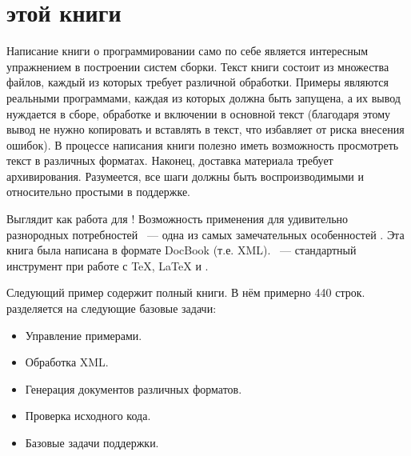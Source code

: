 \section{\Makefile{} этой книги}

Написание книги о программировании само по себе является интересным
упражнением в построении систем сборки. Текст книги состоит из
множества файлов, каждый из которых требует различной
обработки. Примеры являются реальными программами, каждая из которых
должна быть запущена, а их вывод нуждается в сборе, обработке и
включении в основной текст (благодаря этому вывод не нужно копировать
и вставлять в текст, что избавляет от риска внесения ошибок). В
процессе написания книги полезно иметь возможность просмотреть текст в
различных форматах. Наконец, доставка материала требует
архивирования. Разумеется, все шаги должны быть воспроизводимыми и
относительно простыми в поддержке.

Выглядит как работа для \GNUmake{}! Возможность применения для
удивительно разнородных потребностей ~--- одна из самых замечательных
особенностей \GNUmake{}. Эта книга была написана в формате DocBook
(т.е. XML). \GNUmake{} ~--- стандартный инструмент при работе с
\TeX{}, \LaTeX{} и .

Следующий пример содержит полный \Makefile{} книги. В нём примерно 440
строк. \Makefile{} разделяется на следующие базовые задачи:

\begin{itemize}
  \item{} Управление примерами.
  \item{} Обработка XML.
  \item{} Генерация документов различных форматов.
  \item{} Проверка исходного кода.
  \item{} Базовые задачи поддержки.
\end{itemize}


